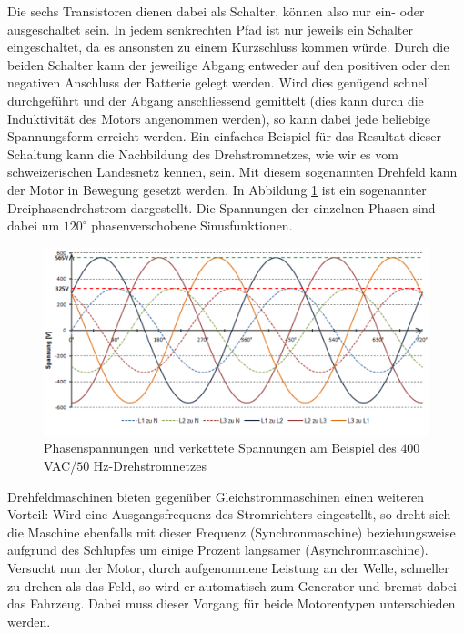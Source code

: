 \newpage

Die sechs Transistoren dienen dabei als Schalter, können also nur ein- oder ausgeschaltet sein. In jedem senkrechten Pfad ist nur jeweils ein Schalter eingeschaltet, da es ansonsten zu einem Kurzschluss kommen würde. Durch die beiden Schalter kann der jeweilige Abgang entweder auf den positiven oder den negativen Anschluss der Batterie gelegt werden. Wird dies genügend schnell durchgeführt und der Abgang anschliessend gemittelt (dies kann durch die Induktivität des Motors angenommen werden), so kann dabei jede beliebige Spannungsform erreicht werden. Ein einfaches Beispiel für das Resultat dieser Schaltung kann die Nachbildung des Drehstromnetzes, wie wir es vom schweizerischen Landesnetz kennen, sein. Mit diesem sogenannten Drehfeld kann der Motor in Bewegung gesetzt werden. In Abbildung \ref{fig:Phasenspannungen} ist ein sogenannter Dreiphasendrehstrom dargestellt. Die Spannungen der einzelnen Phasen sind dabei um $120^\circ$ phasenverschobene Sinusfunktionen.

\begin{figure}[h!]
	\centering
		\includegraphics[width=1.00\textwidth]{images/Phasenspannungen.PNG}
	\caption{Phasenspannungen und verkettete Spannungen am Beispiel des $400$ VAC/$50$ Hz-Drehstromnetzes \cite{phasen}}
	\label{fig:Phasenspannungen}
\end{figure}

Drehfeldmaschinen bieten gegenüber Gleichstrommaschinen einen weiteren Vorteil: Wird eine Ausgangsfrequenz des Stromrichters eingestellt, so dreht sich die Maschine ebenfalls mit dieser Frequenz (Synchronmaschine) beziehungsweise aufgrund des Schlupfes um einige Prozent langsamer (Asynchronmaschine). Versucht nun der Motor, durch aufgenommene Leistung an der Welle, schneller zu drehen als das Feld, so wird er automatisch zum Generator und bremst dabei das Fahrzeug. Dabei muss dieser Vorgang für beide Motorentypen unterschieden werden.

